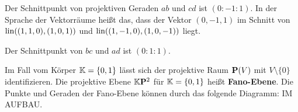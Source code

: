 \begin{bsp}
Der Schnittpunkt von projektiven Geraden $ab$ und $cd$ ist $(0: -1 : 1)$. In der Sprache der Vektorräume heißt das, dass der Vektor $(0,-1,1)$ im Schnitt von $\operatorname{lin}( (1,1,0), (1,0,1))$ und $\operatorname{lin} ((1,-1,0),(1,0,-1))$ liegt. 


Der Schnittpunkt von $bc$ und $ad$ ist $(0:1:1)$.
	
\end{bsp} 

\begin{bsp}
	Im Fall vom Körper $\mathbb K = \{0,1\}$ lässt sich der projektive Raum $\mathbf{P}(V)$ mit $V \setminus \{0\}$ identifizieren. Die projektive Ebene $ \mathbb K \mathbf{P}^2$ für $\mathbb K= \{0,1\}$ heißt \textbf{Fano-Ebene}. Die Punkte und Geraden der Fano-Ebene können durch das folgende Diagramm: IM AUFBAU. 
\end{bsp} 
